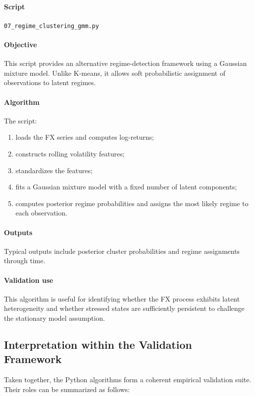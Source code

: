 	\paragraph{Script}
	\texttt{07\_regime\_clustering\_gmm.py}
	
	\paragraph{Objective}
	This script provides an alternative regime-detection framework using a Gaussian mixture model. Unlike K-means, it allows soft probabilistic assignment of observations to latent regimes.
	
	\paragraph{Algorithm}
	The script:
	\begin{enumerate}
		\item loads the FX series and computes log-returns;
		\item constructs rolling volatility features;
		\item standardizes the features;
		\item fits a Gaussian mixture model with a fixed number of latent components;
		\item computes posterior regime probabilities and assigns the most likely regime to each observation.
	\end{enumerate}
	
	\paragraph{Outputs}
	Typical outputs include posterior cluster probabilities and regime assignments through time.
	
	\paragraph{Validation use}
	This algorithm is useful for identifying whether the FX process exhibits latent heterogeneity and whether stressed states are sufficiently persistent to challenge the stationary model assumption.
	
	\subsection{Interpretation within the Validation Framework}
	
	Taken together, the Python algorithms form a coherent empirical validation suite. Their roles can be summarized as follows:
	

